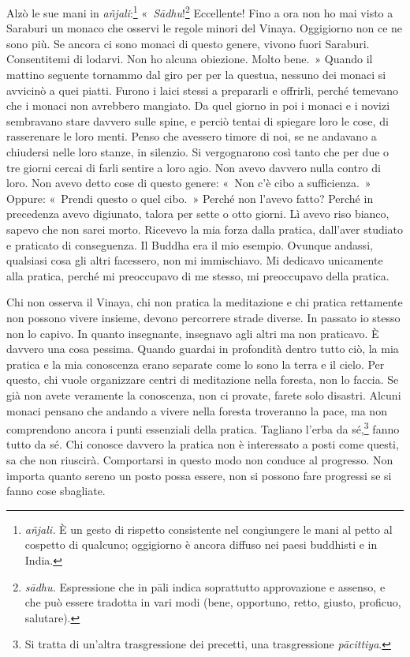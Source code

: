 Alzò le sue mani in \emph{añjali}:\footnote{\emph{añjali.} È un gesto di
  rispetto consistente nel congiungere le mani al petto al cospetto di
  qualcuno; oggigiorno è ancora diffuso nei paesi buddhisti e in India.}
«~\emph{Sādhu}!\footnote{\emph{sādhu.} Espressione che in pāli indica
  soprattutto approvazione e assenso, e che può essere tradotta in vari
  modi (bene, opportuno, retto, giusto, proficuo, salutare).}
Eccellente! Fino a ora non ho mai visto a Saraburi un monaco che osservi
le regole minori del Vinaya. Oggigiorno non ce ne sono più. Se ancora ci
sono monaci di questo genere, vivono fuori Saraburi. Consentitemi di
lodarvi. Non ho alcuna obiezione. Molto bene.~» Quando il mattino
seguente tornammo dal giro per per la questua, nessuno dei monaci si
avvicinò a quei piatti. Furono i laici stessi a prepararli e offrirli,
perché temevano che i monaci non avrebbero mangiato. Da quel giorno in
poi i monaci e i novizi sembravano stare davvero sulle spine, e perciò
tentai di spiegare loro le cose, di rasserenare le loro menti. Penso che
avessero timore di noi, se ne andavano a chiudersi nelle loro stanze, in
silenzio. Si vergognarono così tanto che per due o tre giorni cercai di
farli sentire a loro agio. Non avevo davvero nulla contro di loro. Non
avevo detto cose di questo genere: «~Non c'è cibo a sufficienza.~»
Oppure: «~Prendi questo o quel cibo.~» Perché non l'avevo fatto? Perché
in precedenza avevo digiunato, talora per sette o otto giorni. Lì avevo
riso bianco, sapevo che non sarei morto. Ricevevo la mia forza dalla
pratica, dall'aver studiato e praticato di conseguenza. Il Buddha era il
mio esempio. Ovunque andassi, qualsiasi cosa gli altri facessero, non mi
immischiavo. Mi dedicavo unicamente alla pratica, perché mi preoccupavo
di me stesso, mi preoccupavo della pratica.

Chi non osserva il Vinaya, chi non pratica la meditazione e chi pratica
rettamente non possono vivere insieme, devono percorrere strade diverse.
In passato io stesso non lo capivo. In quanto insegnante, insegnavo agli
altri ma non praticavo. È davvero una cosa pessima. Quando guardai in
profondità dentro tutto ciò, la mia pratica e la mia conoscenza erano
separate come lo sono la terra e il cielo. Per questo, chi vuole
organizzare centri di meditazione nella foresta, non lo faccia. Se già
non avete veramente la conoscenza, non ci provate, farete solo disastri.
Alcuni monaci pensano che andando a vivere nella foresta troveranno la
pace, ma non comprendono ancora i punti essenziali della pratica.
Tagliano l'erba da sé,\footnote{Si tratta di un'altra trasgressione dei
  precetti, una trasgressione \emph{pācittiya}.} fanno tutto da sé. Chi
conosce davvero la pratica non è interessato a posti come questi, sa che
non riuscirà. Comportarsi in questo modo non conduce al progresso. Non
importa quanto sereno un posto possa essere, non si possono fare
progressi se si fanno cose sbagliate.

